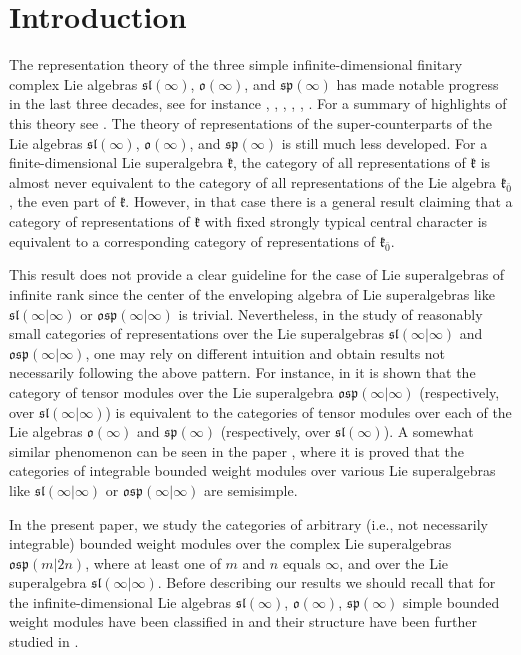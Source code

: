 \documentclass[12pt]{amsart}
\makeatletter
\def\@putname#1#2#3#4{\def\@@ref{#3}\let\old@bf\bf
        \def\bf##1{\old@bf\if?\noexpand##1?{#4}\else##1\fi}%
	#1{#2}%
        \let\bf\old@bf}
\def\@putname#1#2#3#4{\def\@@ref{#3}\let\old@bf\bf	%
	\let\old@reset@font\reset@font			%
        \def\bf##1{\old@bf\if?\noexpand##1?{#4}\else##1\fi}%
	\def\reset@font##1##2{\old@reset@font##1\if?\noexpand##2?{#4}\else##2\fi}#1{#2}%
        \let\bf\old@bf\let\reset@font\old@reset@font}
\let\my@cite=\cite
\def\cite#1{\@putname\my@cite{#1}{\@citeb}{\tiny\rm\@@ref}}
\theoremstyle{plain} %
\numberwithin{equation}{section}
\theoremstyle{definition}
\theoremstyle{remark}
\theoremstyle{plain} %
\renewcommand{\sp}{\mathfrak{sp}}
\renewcommand{\sl}{\mathfrak{sl}}
\newcommand{\osp}{\mathfrak{osp}}
\makeatother
\begin{document}
\section*{Introduction}
The representation theory of the three simple infinite-dimensional finitary complex Lie algebras  $\sl (\infty)$, $\mathfrak o (\infty)$, and $\sp (\infty)$ has made notable progress in the last three decades, see for instance  \cite{DPS},  \cite{DP}, \cite{PSer1}, \cite{PSer2}, \cite{PStyr}, \cite{SS}. For a  summary of highlights of this theory  see  \cite{PH}. The theory of representations of the super-counterparts of the Lie algebras $\sl (\infty)$, $\mathfrak o (\infty)$, and $\sp (\infty)$ is still much less developed. For a finite-dimensional Lie superalgebra $\mathfrak k$, the category of all representations of $\mathfrak k$ is almost never equivalent to the category of all representations of the Lie algebra $\mathfrak k_{\bar{0}}$, the even part  of  $\mathfrak k$. However, in that case  there is a general result claiming that 
a category of representations of $\mathfrak k$ with fixed strongly typical central character is equivalent to a corresponding category of representations of $\mathfrak k_{\bar{0}}$.

 This result does not provide a clear guideline for the case of Lie superalgebras of infinite rank  since  the center of the enveloping algebra of  Lie superalgebras like $\sl (\infty | \infty)$ or $\osp (\infty | \infty)$ is trivial. Nevertheless, in the study of  reasonably small categories of representations over the Lie superalgebras  $\sl (\infty | \infty)$ and $\osp (\infty | \infty)$, one may rely on different intuition and obtain results not necessarily following the above pattern. For instance, in \cite{S} it is shown that the category of tensor modules  over the Lie superalgebra  $\osp (\infty | \infty)$ (respectively, over  $\sl (\infty | \infty)$) is  equivalent to the categories of tensor modules  over each of the Lie algebras $\mathfrak o (\infty)$ and $\sp (\infty)$ (respectively, over $\sl (\infty)$).  A somewhat similar phenomenon can be seen in the paper \cite{CP}, where it is proved that the categories of integrable bounded weight  modules over various Lie superalgebras like $\sl (\infty | \infty)$ or $\osp (\infty | \infty)$ are semisimple.

In the present paper, we study the categories of arbitrary (i.e., not necessarily  integrable) bounded weight modules over the complex Lie superalgebras $\osp (m | 2n)$,  where at least one of $m$ and $n$ equals $\infty$, and over the Lie superalgebra $\sl (\infty | \infty)$. Before describing our results we should recall that for the infinite-dimensional Lie algebras $\mathfrak{sl} (\infty)$, $\mathfrak o (\infty)$, $\mathfrak{sp}(\infty)$ simple bounded weight modules have been classified in \cite{GrP} and their structure have been further studied in \cite{C}.
\end{document}
